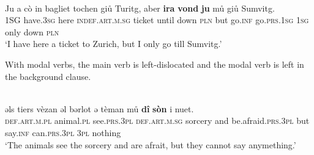\ea\label{ex:1:büchli}
\\
\gll  Ju a cò in bagliet tochen giů Turitg, aber \textbf{ira} \textbf{vond} \textbf{ju} mů giů Sumvitg.\\
     1\textsc{SG} have.3\textsc{sg} here \textsc{indef.art.m.sg} ticket until down \textsc{pln} but go.\textsc{inf} go.\textsc{prs}.1\textsc{sg} 1\textsc{sg} only down \textsc{pln}\\
\glt `I have here a ticket to Zurich, but I only go till Sumvitg.'
\z

With modal verbs, the main verb is left-dislocated and the modal verb is left in the background clause.

\ea\label{}
\\
\gll ǝls tiers vèzan ǝl bǝrlot ǝ tèman mů \textbf{dî} \textbf{sòn} i nuet.\\
     \textsc{def.art.m.pl} animal.\textsc{pl} see.\textsc{prs.3pl} \textsc{def.art.m.sg} sorcery and be.afraid.\textsc{prs.3pl} but say.\textsc{inf} can.\textsc{prs.3pl} \textsc{3pl} nothing\\
\glt `The animals see the sorcery and are afrait, but they cannot say anymething.'
\z


